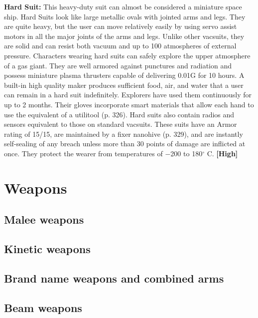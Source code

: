 \textbf{Hard Suit:} This heavy-duty suit can almost be considered a miniature space ship. Hard Suits look like large metallic ovals with jointed arms and legs. They are quite heavy, but the user can move relatively easily by using servo assist motors in all the major joints of the arms and legs. Unlike other vacsuits, they are solid and can resist both vacuum and up to 100 atmospheres of external pressure. Characters wearing hard suits can safely explore the upper atmosphere of a gas giant. They are well armored against punctures and radiation and possess miniature plasma thrusters capable of delivering 0.01G for 10 hours. A built-in high quality maker produces sufficient food, air, and water that a user can remain in a hard suit indefinitely. Explorers have used them continuously for up to 2 months. Their gloves incorporate smart materials that allow each hand to use the equivalent of a utilitool (p. 326). Hard suits also contain radios and sensors equivalent to those on standard vacsuits. These suits have an Armor rating of 15/15, are maintained by a fixer nanohive (p. 329), and are instantly self-sealing of any breach unless more than 30 points of damage are inflicted at once. They protect the wearer from temperatures of $-$200 to 180$^{\circ}$ C. \textbf{[High]}


\section{Weapons}
\label{sec:weapons}

\subsection{Malee weapons}
\label{sec:melee-weapons}

\subsection{Kinetic weapons}
\label{sec:kinetic-weapons}

\subsection{Brand name weapons and combined arms}
\label{sec:brand-weapons-combined}

\subsection{Beam weapons}
\label{sec:beam-weapons}

